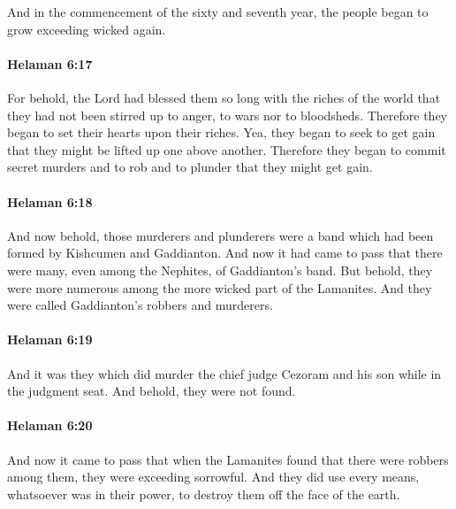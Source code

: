			And in the commencement of the sixty and seventh year,
			the people began to grow exceeding wicked again.

		\paragraph{Helaman 6:17} %
			\label{HELAMAN-6-17}

			For behold, the Lord had blessed them so long with the riches of the world
			that they had not been stirred up to anger, to wars nor to bloodsheds.
			Therefore they began to set their hearts upon their riches.
			Yea, they began to seek to get gain
			that they might be lifted up one above another.
			Therefore they began to commit secret murders and to rob and to plunder
			that they might get gain.

		\paragraph{Helaman 6:18} %
			\label{HELAMAN-6-18}

			And now behold, those murderers and plunderers were a band
			which had been formed by Kishcumen and Gaddianton.
			And now it had came to pass that
			there were many, even among the Nephites, of Gaddianton's band.
			But behold, they were more numerous
			among the more wicked part of the Lamanites.
			And they were called Gaddianton's robbers and murderers.

		\paragraph{Helaman 6:19} %
			\label{HELAMAN-6-19}

			And it was they which did murder the chief judge Cezoram and his son
			while in the judgment seat.
			And behold, they were not found.

		\paragraph{Helaman 6:20} %
			\label{HELAMAN-6-20}

			And now it came to pass that
			when the Lamanites found that there were robbers among them,
			they were exceeding sorrowful.
			And they did use every means, whatsoever was in their power,
			to destroy them off the face of the earth.

